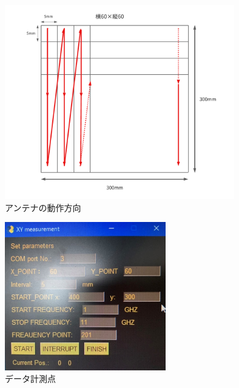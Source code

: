 \documentclass[12pt,a4paper]{jsreport}
\begin{document}
  \begin{figure}[h]
    \begin{center}
     \includegraphics[width=10cm]{./image/sweep.pdf}
    \caption{アンテナの動作方向}\label{アンテナの動作方向}
    \end{center}
    \end{figure}


  \begin{figure}[h]
    \begin{center}
     \includegraphics[width=7cm]{./dataimage/exp_image/gui.jpg}
    \caption{データ計測点}\label{データ計測点}
    \end{center}
    \end{figure}

\end{document}
